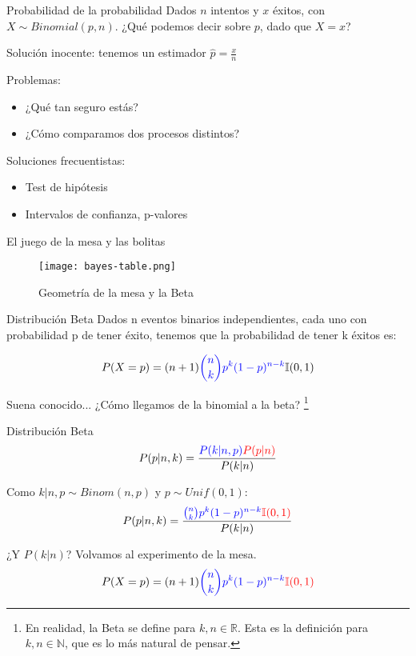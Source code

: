 \documentclass{beamer}
\begin{document}
\begin{frame}{Probabilidad de la probabilidad}
	Dados $n$ intentos y $x$ éxitos, con $X \sim Binomial(p, n)$.
	¿Qué podemos decir sobre $p$, dado que $X = x$?\pause

	Solución inocente: tenemos un estimador $\hat{p} = \frac{x}{n}$\pause

	Problemas:
	\begin{itemize}
		\item ¿Qué tan seguro estás?
		\item ¿Cómo comparamos dos procesos distintos?
	\end{itemize}

	Soluciones frecuentistas:
	\begin{itemize}
		\item Test de hipótesis
		\item Intervalos de confianza, p-valores
	\end{itemize}
\end{frame}

\begin{frame}{El juego de la mesa y las bolitas}
	\begin{figure}
		\centering
		\texttt{[image: bayes-table.png]}
		\caption{Geometría de la mesa y la Beta}
		\label{fig:bayes-table}
	\end{figure}
\end{frame}

\begin{frame}{Distribución Beta}
	Dados n eventos binarios independientes, cada uno con probabilidad p de tener éxito, tenemos que la probabilidad de tener k éxitos es:
	
	$$P(X=p) =
		(n+1)
		\textcolor{blue}{\binom{n}{k} p^k (1-p)^{n-k}}
		\mathbb{I}(0,1)$$

	Suena conocido... ¿Cómo llegamos de la binomial a la beta?
	\footnote{En realidad, la Beta se define para $k,n \in \mathbb{R}$. Esta es la definición para $k,n \in \mathbb{N}$, que es lo más natural de pensar.}
\end{frame}

\begin{frame}{Distribución Beta}
	$$P(p|n,k) = \frac{
		\textcolor{blue}{P(k|n,p)}
		\textcolor{red}{P(p|n)}
	}{
		P(k|n)
	}$$
	\pause

	Como $k|n,p \sim Binom(n, p)$ y $p \sim Unif(0, 1)$:
	$$P(p|n,k) = \frac{
		\textcolor{blue}{\binom{n}{k} p^k (1-p)^{n-k}}
		\textcolor{red}{\mathbb{I}(0,1)}
	}{
		P(k|n)
	}$$
	\pause

	¿Y $P(k|n)$? Volvamos al experimento de la mesa.
	\pause
	$$
		P(X=p) =
		(n+1)
		\textcolor{blue}{\binom{n}{k} p^k (1-p)^{n-k}}
		\textcolor{red}{\mathbb{I}(0,1)}
	$$
\end{frame}
\end{document}
